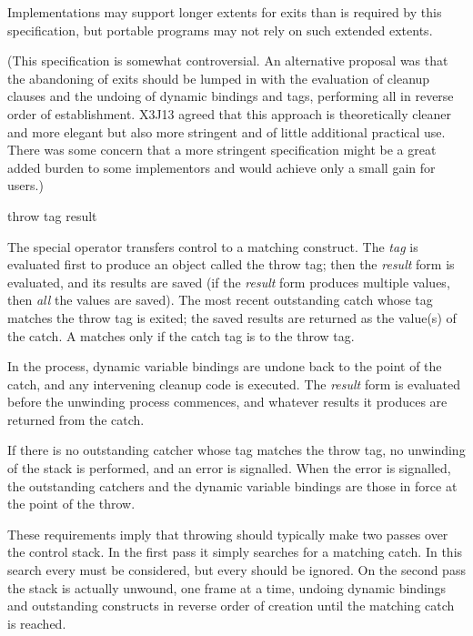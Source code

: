 \begin{defspec}
\begin{newer}
Implementations may support longer extents for exits than is
required by this specification,
but portable programs may not rely on such extended extents.

(This specification is somewhat controversial.  An alternative proposal was
that the abandoning of exits should be lumped in with
the evaluation of  cleanup clauses and the
undoing of dynamic bindings and  tags, performing all
in reverse order of establishment.  X3J13 agreed that this approach is
theoretically cleaner and more elegant but also more stringent
and of little additional practical use.  There was some concern that
a more stringent specification might be a great added burden to some
implementors and would achieve only a small gain for users.)
\end{newer}
\end{defspec}

\begin{defspec}
throw tag result

The  special operator transfers control to a matching
 construct.
The \emph{tag} is evaluated first to produce an object
called the throw tag; then the \emph{result} form is evaluated,
and its results are saved (if the \emph{result} form produces
multiple values, then \emph{all} the values are saved).
The most recent outstanding catch whose tag matches the throw tag
is exited; the saved results are returned as the value(s) of the catch.
A  matches only if the catch tag is  to the throw tag.

In the process, dynamic variable
bindings are undone back to the point of the catch, and any intervening
 cleanup code is executed.
The \emph{result} form is evaluated before the unwinding process commences,
and whatever results it produces are returned from the catch.

If there is no outstanding catcher whose tag matches the throw tag,
no unwinding of the stack is performed, and an error is signalled.
When the error is signalled, the outstanding catchers and the dynamic
variable bindings are those in force at the point of the throw.

\beforenoterule
\begin{implementation}
These requirements imply that throwing should typically
make two passes over the control stack.  In the first pass it simply
searches for a matching catch.  In this search every 
must be considered, but every
 should be ignored.  On the second pass the stack
is actually unwound, one frame at a time, undoing dynamic bindings
and outstanding  constructs in reverse order of creation
until the matching catch is reached.
\end{implementation}
\afternoterule
\end{defspec}

